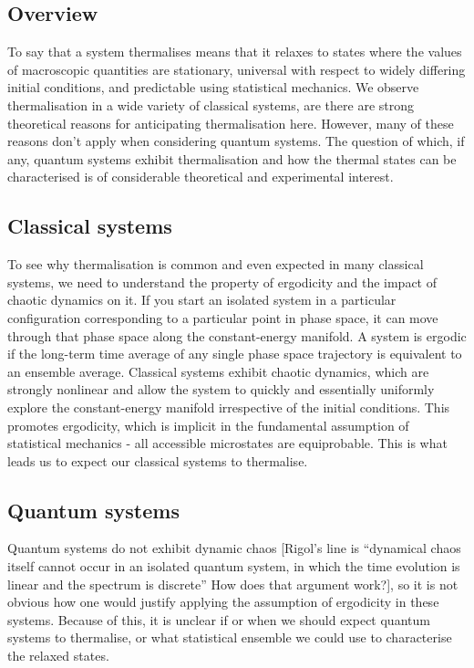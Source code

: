 \documentclass[a4paper,10pt]{article}
\begin{document}
 \subsection{Overview}
 
To say that a system thermalises means that it relaxes to states where the values of macroscopic quantities are stationary, universal with respect to 
widely differing initial conditions, and predictable using statistical mechanics\cite{Rigol2008}. We observe thermalisation in a wide variety of classical systems, are there 
are strong theoretical reasons for anticipating thermalisation here. However, many of these reasons don't apply when considering quantum systems. The question of 
which, if any, quantum systems exhibit thermalisation and how the thermal states can be characterised is of considerable theoretical and experimental interest. 

 \subsection{Classical systems}
To see why thermalisation is common and even expected in many classical systems, we need to understand the property of ergodicity and the impact of chaotic dynamics on it. 
If you start an isolated system in a particular configuration corresponding to a particular point in phase space, it can move through that phase space along the constant-energy
manifold. A system is ergodic if the long-term time average of any single phase space trajectory is equivalent to an ensemble average.  
Classical systems  exhibit chaotic dynamics, which are strongly nonlinear and allow the system to quickly 
and essentially uniformly explore the constant-energy manifold irrespective of the initial conditions. This promotes ergodicity, which is implicit in the fundamental assumption of 
statistical mechanics - all accessible microstates are equiprobable.  This is what leads us to expect our classical systems to thermalise.

 \subsection{Quantum systems}
Quantum systems do not  exhibit dynamic chaos  [Rigol's line is ``dynamical chaos itself cannot occur in an isolated quantum system, in which the time 
evolution is linear and the spectrum is discrete'' How does that argument work?], so it is not obvious how one would justify applying the assumption of ergodicity in these systems. Because of 
this, it is unclear if or when we should expect quantum systems to thermalise, or what statistical ensemble we could use to characterise the relaxed states. 
\end{document}
